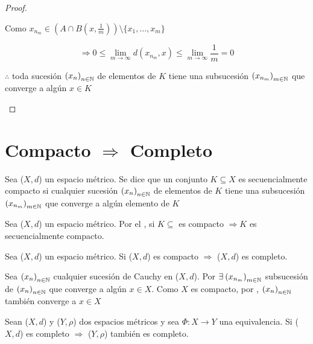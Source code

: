 \begin{proof}
\begin{enumerate}
        Como $x_{n_m} \in  \left(  A \cap B\left(x, \frac{1}{m}\right) \right) \setminus \{ x_1, ..., x_{m} \}$

        $$\Rightarrow 0 \leqslant \lim_{m \to \infty} d(x_{n_m}, x ) \leqslant \lim_{m \to \infty} \frac{1}{m} = 0$$

        $\therefore$ toda sucesión ${\left( x_n \right)}_{n \in \mathbb{N}}$ de elementos de $K$ tiene una subsucesión ${\left( x_{n_m} \right)}_{m \in \mathbb{N}}$ que converge a algún $x \in K$
    \end{enumerate}
\end{proof}

\section{Compacto $\Rightarrow$ Completo}

\begin{definition} \label{def421}
    Sea ($X,d$) un espacio métrico. Se dice que un conjunto $K \subseteq X$ es secuencialmente compacto si cualquier sucesión ${\left( x_n \right)}_{n \in \mathbb{N}}$ de elementos de $K$ tiene una subsucesión ${\left( x_{n_m} \right)}_{m \in \mathbb{N}}$ que converge a algún elemento de $K$
\end{definition}

\begin{corollary}
    Sea ($X,d$) un espacio métrico. Por el , si $K \subseteq$ es compacto $\Rightarrow K$ es secuencialmente compacto.
\end{corollary}

\begin{corollary}
    Sea ($X,d$) un espacio métrico. Si ($X,d$) es compacto $\Rightarrow$ ($X,d$) es completo.
\end{corollary}

\begin{orangeproof}
    Sea ${\left( x_n \right)}_{n \in \mathbb{N}}$ cualquier sucesión de Cauchy en ($X,d$). Por  $\exists \: {\left( x_{n_m} \right)}_{m \in \mathbb{N}}$ subsucesión de ${\left( x_n \right)}_{n \in \mathbb{N}}$ que converge a algún $x \in X$. Como $X$ es compacto, por , ${\left( x_n \right)}_{n \in \mathbb{N}}$ también converge a $x \in X$
\end{orangeproof}

\begin{theorem}
    Sean ($X,d$) y ($Y,\rho$) dos espacios métricos y sea $ \Phi : X \to Y$ una equivalencia. Si ($X,d$) es completo $\Rightarrow$ ($Y,\rho$) también es completo.
\end{theorem}

